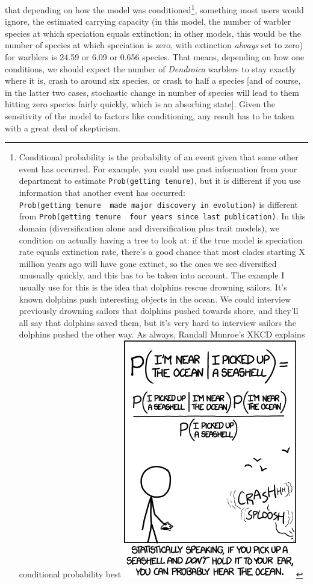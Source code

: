 \documentclass[]{book}
\let\rmarkdownfootnote\footnote%
\def\footnote{\protect\rmarkdownfootnote}
\theoremstyle{definition}
\theoremstyle{definition}
\theoremstyle{remark}
\begin{document}
that depending on how the model was conditioned\footnote{Conditional
  probability is the probability of an event given that some other event
  has occurred. For example, you could use past information from your
  department to estimate \texttt{Prob(getting\ tenure)}, but it is
  different if you use information that another event has occurred:
  \texttt{Prob(getting\ tenure\ \textbar{}\ made\ major\ discovery\ in\ evolution)}
  is different from
  \texttt{Prob(getting\ tenure\ \textbar{}\ four\ years\ since\ last\ publication)}.
  In this domain (diversification alone and diversification plus trait
  models), we condition on actually having a tree to look at: if the
  true model is speciation rate equals extinction rate, there's a good
  chance that most clades starting X million years ago will have gone
  extinct, so the ones we see diversified unusually quickly, and this
  has to be taken into account. The example I usually use for this is
  the idea that dolphins rescue drowning sailors. It's known dolphins
  push interesting objects in the ocean. We could interview previously
  drowning sailors that dolphins pushed towards shore, and they'll all
  say that dolphins saved them, but it's very hard to interview sailors
  the dolphins pushed the other way. As always, Randall Munroe's XKCD
  explains conditional probability best
  \includegraphics{images/seashell.png}}, something most users would
ignore, the estimated carrying capacity (in this model, the number of
warbler species at which speciation equals extinction; in other models,
this would be the number of species at which speciation is zero, with
extinction \emph{always} set to zero) for warblers is 24.59 or 6.09 or
0.656 species. That means, depending on how one conditions, we should
expect the number of \emph{Dendroica} warblers to stay exactly where it
is, crash to around six species, or crash to half a species {[}and of
course, in the latter two cases, stochastic change in number of species
will lead to them hitting zero species fairly quickly, which is an
absorbing state{]}. Given the sensitivity of the model to factors like
conditioning, any result has to be taken with a great deal of
skepticism.
\end{document}
